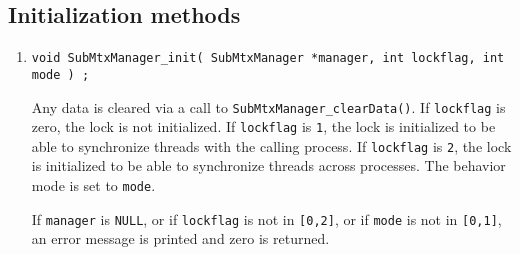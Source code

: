 \subsection{Initialization methods}
\label{subsection:SubMtxManager:proto:initial}
\par
\begin{enumerate}
\item
\begin{verbatim}
void SubMtxManager_init( SubMtxManager *manager, int lockflag, int mode ) ;
\end{verbatim}
Any data is cleared via a call to
{\tt SubMtxManager\_clearData()}.
If {\tt lockflag} is zero, the lock is not initialized.
If {\tt lockflag} is {\tt 1}, the lock is initialized
to be able to synchronize threads with the calling process.
If {\tt lockflag} is {\tt 2}, the lock is initialized
to be able to synchronize threads across processes.
The behavior mode is set to {\tt mode}.
\par {}
If {\tt manager} is {\tt NULL},
or if {\tt lockflag} is not in {\tt [0,2]},
or if {\tt mode} is not in {\tt [0,1]},
an error message is printed and zero is returned.
\end{enumerate}
\par
